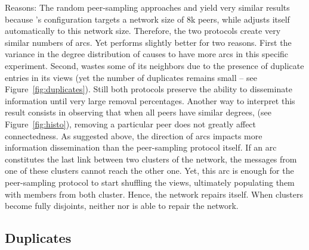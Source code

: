 \begin{asparadesc}
\item[Reasons:] The random peer-sampling approaches \CYCLON and \SPRAY yield
  very similar results because \CYCLON's configuration targets a network size of
  8k peers, while \SPRAY adjusts itself automatically to this network size.
  Therefore, the two protocols create very similar numbers of arcs. Yet \CYCLON
  performs slightly better for two reasons. First the variance in the degree
  distribution of \SPRAY causes \CYCLON to have more arcs in this specific
  experiment. Second, \SPRAY wastes some of its neighbors due to the presence of
  duplicate entries in its views (yet the number of duplicates remains small --
  see Figure~\ref{fig:duplicates}). Still both protocols preserve the ability to
  disseminate information until very large removal percentages. Another way to
  interpret this result consists in observing that when all peers have similar
  degrees, (see Figure~\ref{fig:histo}), removing a particular peer does not
  greatly affect connectedness. As suggested above, the direction of arcs
  impacts more information dissemination than the peer-sampling protocol
  itself. If an arc constitutes the last link between two clusters of the
  network, the messages from one of these clusters cannot reach the other
  one. Yet, this arc is enough for the peer-sampling protocol to start shuffling
  the views, ultimately populating them with members from both cluster. Hence,
  the network repairs itself.  When clusters become fully disjoints, neither
  \CYCLON nor \SPRAY is able to repair the network.

\end{asparadesc}

\subsection{Duplicates}

